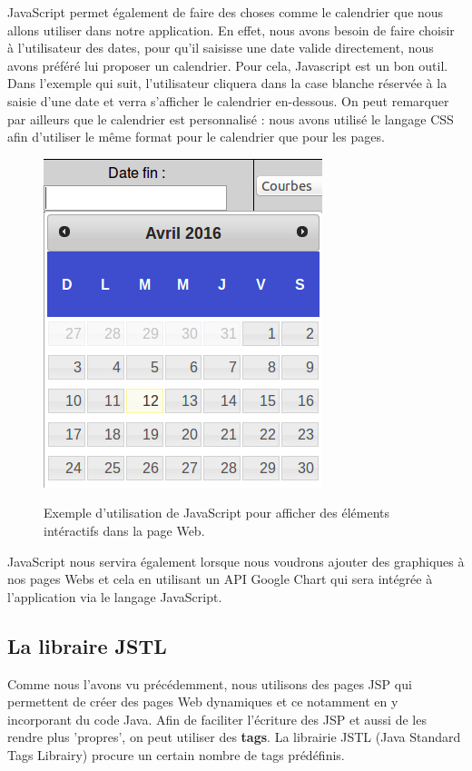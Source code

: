 JavaScript permet également de faire des choses comme le calendrier que nous allons utiliser dans notre application. En effet, nous avons besoin de faire choisir à l'utilisateur des dates, pour qu'il saisisse une date valide directement, nous avons préféré lui proposer un calendrier. Pour cela, Javascript est un bon outil. Dans l'exemple qui suit, l'utilisateur cliquera dans la case blanche réservée à la saisie d'une date et verra s'afficher le calendrier en-dessous. On peut remarquer par ailleurs que le calendrier est personnalisé : nous avons utilisé le langage CSS afin d'utiliser le même format pour le calendrier que pour les pages.
\begin{figure}[H]
  \center
  \includegraphics[scale=0.5]{../graph/JavaScriptCalendrier.png} \\
  \caption{Exemple d'utilisation de JavaScript pour afficher des éléments intéractifs dans la page Web.}
\end{figure}

JavaScript nous servira également lorsque nous voudrons ajouter des graphiques à nos pages Webs et cela en utilisant un API Google Chart qui sera intégrée à l'application via le langage JavaScript.

\subsection{La libraire JSTL}
Comme nous l'avons vu précédemment, nous utilisons des pages JSP qui permettent de créer des pages Web dynamiques et ce notamment en y incorporant du code Java. Afin de faciliter l'écriture des JSP et aussi de les rendre plus 'propres', on peut utiliser des \textbf{tags}. La librairie JSTL (Java Standard Tags Librairy) procure un certain nombre de tags prédéfinis.\\

